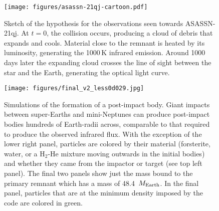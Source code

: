 \documentclass[sn-nature]{sn-jnl}%
\begin{document}
\begin{figure}
    \centering
\texttt{[image: figures/asassn-21qj-cartoon.pdf]}
    \caption{Sketch of the hypothesis for the observations seen towards ASASSN-21qj.
    At $t=0$, the collision occurs, producing a cloud of debris that expands and cools.
    Material close to the remnant is heated by its luminosity, generating the 1000\,K infrared emission.
    Around 1000 days later the expanding cloud crosses the line of sight between the star and the Earth, generating the optical light curve.}
    \label{fig:hypothesis}
\end{figure}


\begin{figure}
    \centering
\texttt{[image: figures/final\_v2\_less0d029.jpg]}
    \caption{Simulations of the formation of a post-impact body.
    Giant impacts between super-Earths and mini-Neptunes can produce post-impact bodies hundreds of Earth-radii across, comparable to that required to produce the observed infrared flux. With the exception of the lower right panel, particles are colored by their material (forsterite, water, or a H$_2$-He mixture moving outwards in the initial bodies) and whether they came from the impactor or target (see top left panel). The final two panels show just the mass bound to the primary remnant which has a mass of 48.4~$M_{\rm Earth}$. In the final panel, particles that are at the minimum density imposed by the code are colored in green.}
    \label{fig:SPH}
\end{figure}
\end{document}

